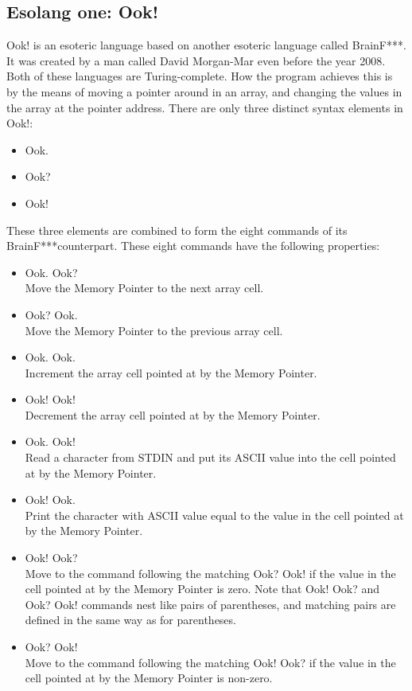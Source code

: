 \documentclass[a4paper]{article}
\begin{document}
	\subsection{Esolang one: Ook!}	
	Ook! is an esoteric language based on another esoteric language called BrainF***. It was created by a man called David Morgan-Mar even before the year 2008. Both of these languages are Turing-complete\cite{ook2}. How the program achieves this is by the means of moving a pointer around in an array, and changing the values in the array at the pointer address. There are only three distinct syntax elements in Ook!:
	\begin{itemize}
	\item Ook.
	\item Ook?
	\item Ook!
	\end{itemize}
	These three elements are combined to form the eight commands of its BrainF***counterpart. These eight commands have the following properties: \cite{ook}
\begin{itemize}

    \item Ook. Ook?\\
    Move the Memory Pointer to the next array cell.
    \item Ook? Ook.\\
    Move the Memory Pointer to the previous array cell.
    \item Ook. Ook.\\
    Increment the array cell pointed at by the Memory Pointer.
    \item Ook! Ook!\\
    Decrement the array cell pointed at by the Memory Pointer.
    \item Ook. Ook!\\
    Read a character from STDIN and put its ASCII value into the cell pointed at by the Memory Pointer.
    \item Ook! Ook.\\
    Print the character with ASCII value equal to the value in the cell pointed at by the Memory Pointer.
    \item Ook! Ook?\\
    Move to the command following the matching Ook? Ook! if the value in the cell pointed at by the Memory Pointer is zero. Note that Ook! Ook? and Ook? Ook! commands nest like pairs of parentheses, and matching pairs are defined in the same way as for parentheses.
    \item Ook? Ook!\\
    Move to the command following the matching Ook! Ook? if the value in the cell pointed at by the Memory Pointer is non-zero. 
\end{itemize}	
\end{document}
